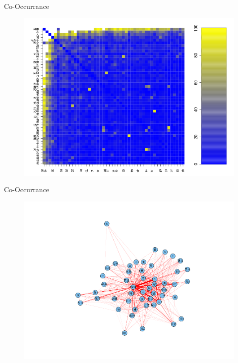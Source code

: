 \documentclass[12pt]{beamer}
\newcommand{\1}[1]{{\mathbf 1}\left\{#1\right\}}        %
\begin{document}
\begin{frame}{Co-Occurrance}

\begin{figure}
  \centering
  \includegraphics[height=0.9\textheight]{./../../coocurResults/cooccurMatPlot.png} 
\end{figure}


\end{frame}

\begin{frame}{Co-Occurrance}

\begin{figure}
  \centering
  \includegraphics[height=0.9\textheight]{./../../coocurResults/cooccurNetwork.png} 
\end{figure}

\end{frame}
\end{document}
